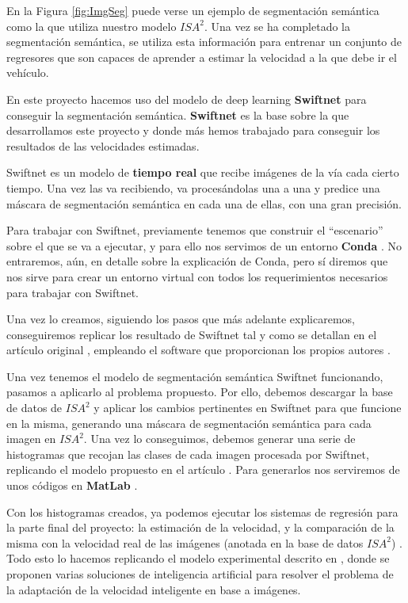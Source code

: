 En la Figura \ref{fig:ImgSeg} puede verse un ejemplo de segmentación semántica como la que utiliza nuestro modelo $ISA^{2}$. Una vez se ha completado la segmentación semántica, se utiliza esta información para entrenar un conjunto de regresores que son capaces de aprender a estimar la velocidad a la que debe ir el vehículo.

En este proyecto hacemos uso del modelo de deep learning \textbf{Swiftnet} \cite{swiftnet} para conseguir la segmentación semántica. \textbf{Swiftnet} es la base sobre la que desarrollamos este proyecto y donde más hemos trabajado para conseguir los resultados de las velocidades estimadas.

Swiftnet es un modelo de \textbf{tiempo real} que recibe imágenes de la vía cada cierto tiempo. Una vez las va recibiendo, va procesándolas una a una y predice una máscara de segmentación semántica en cada una de ellas, con una gran precisión.

Para trabajar con Swiftnet, previamente tenemos que construir el ``escenario'' sobre el que se va a ejecutar, y para ello nos servimos de un entorno \textbf{Conda} \cite{conda}. No entraremos, aún, en detalle sobre la explicación de Conda, pero sí diremos que nos sirve para crear un entorno virtual con todos los requerimientos necesarios para trabajar con Swiftnet.

Una vez lo creamos, siguiendo los pasos que más adelante explicaremos, conseguiremos replicar los resultado de Swiftnet tal y como se detallan en el artículo original \cite{swiftnet}, empleando el software que proporcionan los propios autores \cite{github_swiftnet}.


Una vez tenemos el modelo de segmentación semántica Swiftnet funcionando, pasamos a aplicarlo al problema propuesto. Por ello, debemos descargar la base de datos de $ISA^{2}$ y aplicar los cambios pertinentes en Swiftnet para que funcione en la misma, generando una máscara de segmentación semántica para cada imagen en $ISA^{2}$. Una vez lo conseguimos, debemos generar una serie de histogramas \cite{histograma} que recojan las clases de cada imagen procesada por Swiftnet, replicando el modelo propuesto en el artículo \cite{isa2}. Para generarlos nos serviremos de unos códigos en \textbf{MatLab} \cite{matlab}.

Con los histogramas creados, ya podemos ejecutar los sistemas de regresión para la parte final del proyecto: la estimación de la velocidad, y la comparación de la misma con la velocidad real de las imágenes (anotada en la base de datos $ISA^{2}$) . Todo esto lo hacemos replicando el modelo experimental descrito en \cite{isa2}, donde se proponen varias soluciones de inteligencia artificial para resolver el problema de la adaptación de la velocidad inteligente en base a imágenes.

